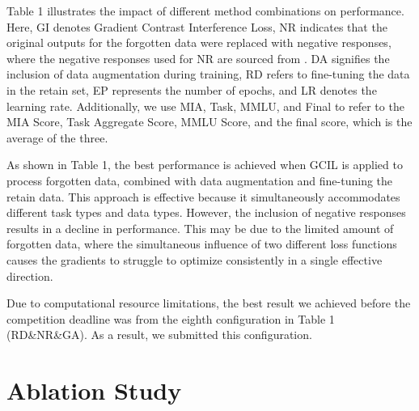 \documentclass[11pt]{article}
\begin{document}
Table 1 illustrates the impact of different method combinations on performance. Here, GI denotes Gradient Contrast Interference Loss, NR indicates that the original outputs for the forgotten data were replaced with negative responses, where the negative responses used for NR are sourced from \citep{tofu2024}. DA signifies the inclusion of data augmentation during training, RD refers to fine-tuning the data in the retain set, EP represents the number of epochs, and LR denotes the learning rate. Additionally, we use MIA, Task, MMLU, and Final to refer to the MIA Score, Task Aggregate Score, MMLU Score, and the final score, which is the average of the three.


As shown in Table 1, the best performance is achieved when GCIL is applied to process forgotten data, combined with data augmentation and fine-tuning the retain data. This approach is effective because it simultaneously accommodates different task types and data types. However, the inclusion of negative responses results in a decline in performance. This may be due to the limited amount of forgotten data, where the simultaneous influence of two different loss functions causes the gradients to struggle to optimize consistently in a single effective direction.


Due to computational resource limitations, the best result we achieved before the competition deadline was from the eighth configuration in Table 1 (RD\&NR\&GA). As a result, we submitted this configuration.



\section{Ablation Study}
\end{document}
